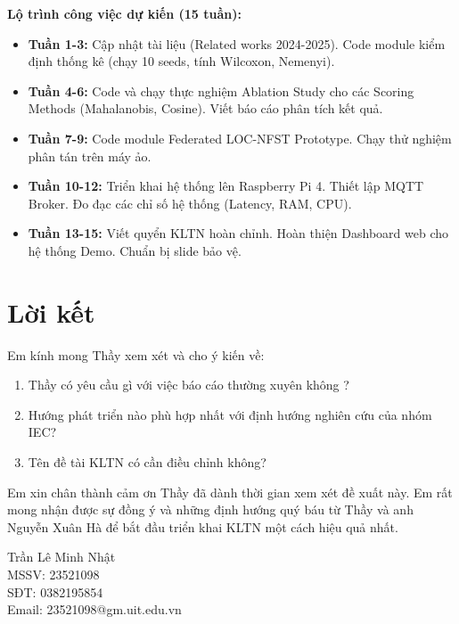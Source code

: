 \documentclass[12pt,a4paper]{article}
\begin{document}
\textbf{Lộ trình công việc dự kiến (15 tuần):}
\begin{itemize}
    \item \textbf{Tuần 1-3:} Cập nhật tài liệu (Related works 2024-2025). Code module kiểm định thống kê (chạy 10 seeds, tính Wilcoxon, Nemenyi).
    \item \textbf{Tuần 4-6:} Code và chạy thực nghiệm Ablation Study cho các Scoring Methods (Mahalanobis, Cosine). Viết báo cáo phân tích kết quả.
    \item \textbf{Tuần 7-9:} Code module Federated LOC-NFST Prototype. Chạy thử nghiệm phân tán trên máy ảo.
    \item \textbf{Tuần 10-12:} Triển khai hệ thống lên Raspberry Pi 4. Thiết lập MQTT Broker. Đo đạc các chỉ số hệ thống (Latency, RAM, CPU).
    \item \textbf{Tuần 13-15:} Viết quyển KLTN hoàn chỉnh. Hoàn thiện Dashboard web cho hệ thống Demo. Chuẩn bị slide bảo vệ.
\end{itemize}

\section{Lời kết}

Em kính mong Thầy xem xét và cho ý kiến về:
\begin{enumerate}[label=(\arabic*)]
    \item Thầy có yêu cầu gì với việc báo cáo thường xuyên không ? 
    \item Hướng phát triển nào phù hợp nhất với định hướng nghiên cứu của nhóm IEC?
    \item Tên đề tài KLTN có cần điều chỉnh không?
\end{enumerate}

Em xin chân thành cảm ơn Thầy đã dành thời gian xem xét đề xuất này. Em rất mong nhận được sự đồng ý và những định hướng quý báu từ Thầy và anh Nguyễn Xuân Hà để bắt đầu triển khai KLTN một cách hiệu quả nhất.

\vspace{1.5cm}

\begin{flushright}
Trần Lê Minh Nhật\\
MSSV: 23521098\\
SĐT: 0382195854\\
Email: 23521098@gm.uit.edu.vn
\end{flushright}
\end{document}
